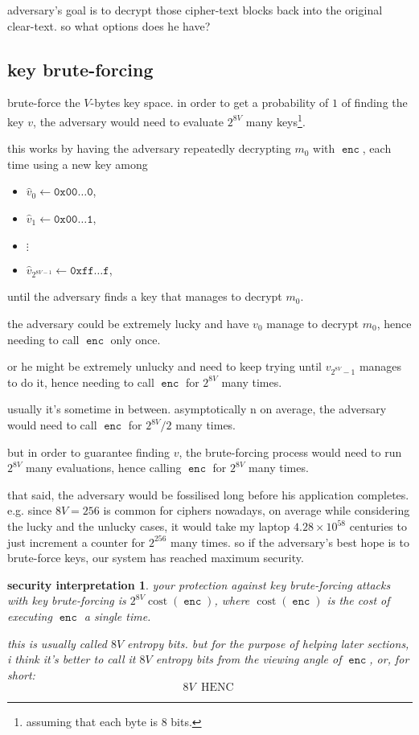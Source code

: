 \documentclass[twocolumn]{article}
\newtheorem{security}{security interpretation}
\DeclareMathOperator{\enc}{\mathtt{enc}}
\DeclareMathOperator{\cost}{cost}
\DeclareMathOperator{\henc}{\; HENC}
\begin{document}
adversary's goal is to decrypt those cipher-text blocks back into the
original clear-text.  so what options does he have?

\subsection{key brute-forcing}
brute-force the $V$-bytes key space.  in order to get a probability of $1$
of finding the key $v$, the adversary would need to evaluate $2^{8V}$ many
keys\footnote{assuming that each byte is $8$ bits.}.

this works by having the adversary repeatedly decrypting $m_0$ with $\enc$,
each time using a new key among
\begin{itemize}
    \item $\hat v_0 \gets \texttt{0x00\ldots 0}$,
    \item $\hat v_1 \gets \texttt{0x00\ldots 1}$,
    \item $\vdots$
    \item $\hat v_{2^{8V-1}} \gets \texttt{0xff\ldots f}$,
\end{itemize}
until the adversary finds a key that manages to decrypt $m_0$.

the adversary could be extremely lucky and have $v_0$ manage to decrypt
$m_0$, hence needing to call $\enc$ only once.  

or he might be extremely unlucky and need to keep trying until
$v_{2^{8V}-1}$ manages to do it, hence needing to call $\enc$ for $2^{8V}$
many times.

usually it's sometime in between.  asymptotically  n on average, the
adversary would need to call $\enc$ for $2^{8V}/2$ many times.

but in order to guarantee finding $v$, the brute-forcing process would need
to run $2^{8V}$ many evaluations, hence calling $\enc$ for $2^{8V}$ many
times.

that said, the adversary would be fossilised long before his application
completes.  e.g.  since $8V = 256$ is common for ciphers nowadays, on
average while considering the lucky and the unlucky cases, it would take my
laptop $4.28\times10^{58}$ centuries to just increment a counter for
$2^{256}$ many times.  so if the adversary's best hope is to brute-force
keys, our system has reached maximum security.

\begin{security}
your protection against key brute-forcing attacks with key brute-forcing is
$2^{8V} \cost(\enc)$, where $\cost(\enc)$ is the cost of executing $\enc$ a
single time.  

this is usually called $8V$ \emph{entropy bits}.  but for the purpose of
helping later sections, i think it's better to call it $8V$ \emph{entropy
bits from the viewing angle of $\enc$}, or, for short:
\[
    8V \henc
\]
\end{security}
\end{document}
